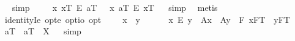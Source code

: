 \begin{isabellebody}
\isadelimproof
\ %
\endisadelimproof
%
\isatagproof
{}\isamarkupfalse%
\ simp\ \isamarkupfalse%
%
\endisatagproof
{\isafoldproof}%
%
\isadelimproof
%
\endisadelimproof
\isanewline
\ \isamarkupfalse%
\ {\isachardoublequoteopen}{\isacharparenleft}\isactrlbold {\isasymlambda}\ x{\isachardot}\ x\isactrlsup T\ \isactrlbold {\isacharequal}\isactrlsub E\ a\isactrlsup T{\isacharparenright}\ {\isacharequal}\ {\isacharparenleft}\isactrlbold {\isasymlambda}\ x{\isachardot}\ a\isactrlsup T\ \isactrlbold {\isacharequal}\isactrlsub E\ x\isactrlsup T{\isacharparenright}{\isachardoublequoteclose}%
\isadelimproof
\ %
\endisadelimproof
%
\isatagproof
{}\isamarkupfalse%
\ simp\ \isamarkupfalse%
\ metis%
\endisatagproof
{\isafoldproof}%
%
\isadelimproof
%
\endisadelimproof
%
\isamarkuptrue%
\ \isamarkupfalse%
\ identityI{\isacharcolon}{\isacharcolon}{\isachardoublequoteopen}e\ opt{\isasymRightarrow}e\ opt{\isasymRightarrow}io\ opt{\isachardoublequoteclose}\ {\isacharparenleft}\ {\isachardoublequoteopen}\isactrlbold {\isacharequal}{\isachardoublequoteclose}\ {}{}{\isacharparenright}\ \ {\isachardoublequoteopen}x\ \isactrlbold {\isacharequal}\ y\ {\isasymequiv}\ \isanewline
\ \ \ \ x\ \isactrlbold {\isacharequal}\isactrlsub E\ y\ \isactrlbold {\isasymor}\ {\isacharparenleft}{\isasymlparr}A{\isacharbang}{\isacharcomma}x{\isasymrparr}\ \isactrlbold {\isasymand}\ {\isasymlparr}A{\isacharbang}{\isacharcomma}y{\isasymrparr}\ \isactrlbold {\isasymand}\ \isactrlbold {\isasymbox}{\isacharparenleft}\isactrlbold {\isasymforall}F{\isachardot}\ {\isasymlbrace}x{\isacharcomma}F\isactrlsup T{\isasymrbrace}\ \isactrlbold {\isasymequiv}\ {\isasymlbrace}y{\isacharcomma}F\isactrlsup T{\isasymrbrace}{\isacharparenright}{\isacharparenright}{\isachardoublequoteclose}%
\isamarkuptrue%
\ \isamarkupfalse%
\ {\isachardoublequoteopen}a\isactrlsup T\ \isactrlbold {\isacharequal}\ a\isactrlsup T\ {\isacharequal}\ X{\isachardoublequoteclose}%
\isadelimproof
\ %
\endisadelimproof
%
\isatagproof
{}\isamarkupfalse%
\ simp\ \isamarkupfalse%
\ \ \ \ \ \ \ \ \ \ \ \ \ \ \ \ \ \ \ \ \ \ \ \ \ \ \ \ \ \ \ \ \ \ \ \ \ \ \ \ %
%
\endisatagproof
{\isafoldproof}%

\end{isabellebody}
